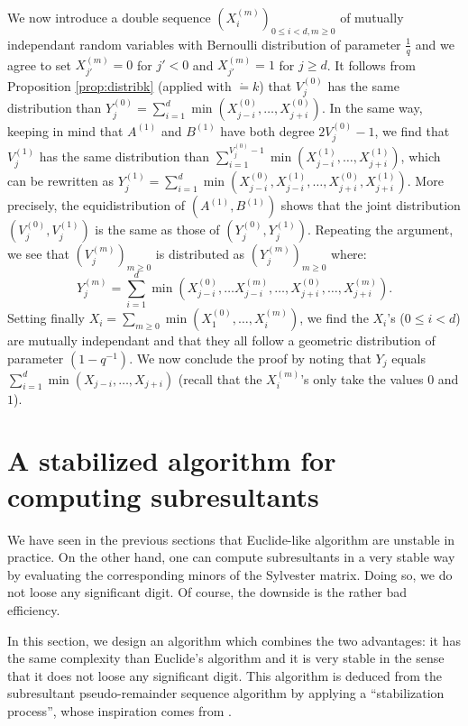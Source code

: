 \documentclass{article}
\begin{document}
We now introduce a double sequence $(X_i^{(m)})_{0 \leq i < d, m 
\geq 0}$ of mutually independant random variables with Bernoulli
distribution of parameter $\frac 1 q$ and we agree to set 
$X_{j'}^{(m)} = 0$ for $j' < 0$ and $X_{j'}^{(m)} = 1$ for $j \geq d$.
It follows from Proposition \ref{prop:distribk} (applied with $\ring = 
k$) that $V_j^{(0)}$ has the same distribution than 
$Y_j^{(0)} = \sum_{i=1}^d \min(X_{j-i}^{(0)}, \ldots, X_{j+i}^{(0)})$.
In the same way, keeping in mind that $A^{(1)}$ and $B^{(1)}$ have both 
degree $2V_j^{(0)} - 1$, we find that $V_j^{(1)}$ has the same 
distribution than $\sum_{i=1}^{V_j^{(0)} - 1} \min(X_{j-i}^{(1)}, 
\ldots, X_{j+i}^{(1)})$, which can be rewritten as
$Y_j^{(1)} = \sum_{i=1}^d \min(X_{j-i}^{(0)}, X_{j-i}^{(1)}, \ldots, 
X_{j+i}^{(0)}, X_{j+i}^{(1)})$. More precisely,
the equidistribution of $(A^{(1)}, B^{(1)})$ shows that the 
joint distribution $(V_j^{(0)}, V_j^{(1)})$ is the same as those
of $(Y_j^{(0)}, Y_j^{(1)})$. Repeating the argument, we see that
$(V_j^{(m)})_{m \geq 0}$ is distributed as $(Y_j^{(m)})_{m \geq 0}$
where:
$$Y_j^{(m)} = \sum_{i=1}^d \min(X_{j-i}^{(0)}, \ldots X_{j-i}^{(m)}, 
\ldots, X_{j+i}^{(0)}, \ldots, X_{j+i}^{(m)}).$$
Setting finally $X_i = \sum_{m \geq 0} \min(X_1^{(0)}, \ldots, 
X_i^{(m)})$, we find the $X_i$'s ($0 \leq i < d$) are mutually 
independant and that they all follow a geometric distribution of 
parameter $(1 - q^{-1})$. We now conclude the proof by noting that 
$Y_j$ equals $\sum_{i=1}^d \min(X_{j-i}, \ldots, X_{j+i})$ (recall
that the $X_i^{(m)}$'s only take the values $0$ and $1$).

\section{A stabilized algorithm for computing subresultants}
\label{sec:stable}

We have seen in the previous sections that Euclide-like algorithm are 
unstable in practice. On the other hand, one can compute subresultants 
in a very stable way by evaluating the corresponding minors of the 
Sylvester matrix. Doing so, we do not loose any significant digit. Of 
course, the downside is the rather bad efficiency.

In this section, we design an algorithm which combines the two
advantages: it has the same complexity than Euclide's algorithm
and it is very stable in the sense that it does not loose any
significant digit. 
This algorithm is deduced from the subresultant pseudo-remainder
sequence algorithm by applying a ``stabilization process'', whose 
inspiration comes from \cite{padicprec}.
\end{document}
